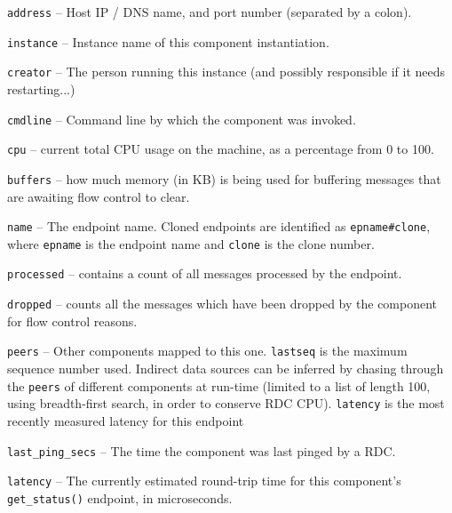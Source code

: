 \documentclass[12pt,a4paper,twoside]{article}
\renewcommand{\_}{\texttt{\symbol{95}}}
\begin{document}
\begin{bulletlist}
\item \verb^address^ -- Host IP / DNS name, and port number (separated by
		a colon).
\item \verb^instance^ -- Instance name of this component instantiation.
\item \verb^creator^ -- The person running this instance (and possibly
		responsible if it needs restarting...)
\item \verb^cmdline^ -- Command line by which the component was invoked.
\item \verb^cpu^ --
	current total CPU usage on the machine, as a percentage from 0 to 100.
\item \verb^buffers^ -- how much memory (in KB) is being used for
	buffering messages that are awaiting flow control to clear.
\item \verb^name^ -- The endpoint name.
		Cloned endpoints are identified as
		\verb^epname#clone^, where \verb^epname^ is the endpoint
		name and \verb^clone^ is the clone number.
\item \verb^processed^ -- contains a count of all messages
	processed by the endpoint.
\item \verb^dropped^ -- counts all the messages which have been dropped
	by the component for flow control reasons.
\item \verb^peers^ --  Other components mapped to this one.
		\verb^lastseq^ is the maximum sequence number used.
      Indirect data sources can be inferred by chasing through the
		\verb^peers^ of different components at run-time
		(limited to a list of length 100, using breadth-first search,
		in order to conserve RDC CPU).
		\verb^latency^ is the most recently measured latency for this endpoint
\item \verb^last_ping_secs^ -- The time the component was last pinged by a RDC.
\item \verb^latency^ -- The currently estimated round-trip time for this
	component's \verb^get_status()^ endpoint, in microseconds.
\end{bulletlist}
\end{document}
